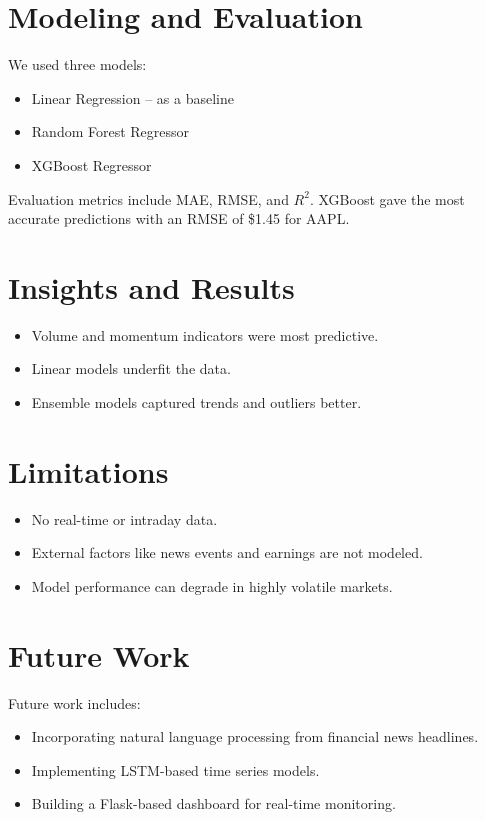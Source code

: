 \documentclass[runningheads]{llncs}
\begin{document}
\section{Modeling and Evaluation}
We used three models:
\begin{itemize}
    \item Linear Regression – as a baseline
    \item Random Forest Regressor
    \item XGBoost Regressor
\end{itemize}
Evaluation metrics include MAE, RMSE, and $R^2$. XGBoost gave the most accurate predictions with an RMSE of \$1.45 for AAPL.

\section{Insights and Results}
\begin{itemize}
    \item Volume and momentum indicators were most predictive.
    \item Linear models underfit the data.
    \item Ensemble models captured trends and outliers better.
\end{itemize}

\section{Limitations}
\begin{itemize}
    \item No real-time or intraday data.
    \item External factors like news events and earnings are not modeled.
    \item Model performance can degrade in highly volatile markets.
\end{itemize}

\section{Future Work}
Future work includes:
\begin{itemize}
    \item Incorporating natural language processing from financial news headlines.
    \item Implementing LSTM-based time series models.
    \item Building a Flask-based dashboard for real-time monitoring.
\end{itemize}
\end{document}
